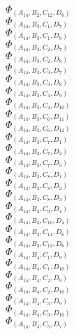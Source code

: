 \documentclass[14pt]{article}
\begin{document}
    $\Phi_{({A}_{14}, {B}_{2}, {C}_{12}, {D}_{6})}$ \\ 
    $\Phi_{({A}_{14}, {B}_{3}, {C}_{1}, {D}_{7})}$ \\ 
    $\Phi_{({A}_{14}, {B}_{3}, {C}_{1}, {D}_{8})}$ \\ 
    $\Phi_{({A}_{14}, {B}_{3}, {C}_{2}, {D}_{7})}$ \\ 
    $\Phi_{({A}_{14}, {B}_{3}, {C}_{2}, {D}_{8})}$ \\ 
    $\Phi_{({A}_{14}, {B}_{3}, {C}_{3}, {D}_{7})}$ \\ 
    $\Phi_{({A}_{14}, {B}_{3}, {C}_{3}, {D}_{8})}$ \\ 
    $\Phi_{({A}_{14}, {B}_{3}, {C}_{4}, {D}_{9})}$ \\ 
    $\Phi_{({A}_{14}, {B}_{3}, {C}_{4}, {D}_{10})}$ \\ 
    $\Phi_{({A}_{14}, {B}_{3}, {C}_{6}, {D}_{11})}$ \\ 
    $\Phi_{({A}_{14}, {B}_{3}, {C}_{6}, {D}_{12})}$ \\ 
    $\Phi_{({A}_{14}, {B}_{3}, {C}_{7}, {D}_{1})}$ \\ 
    $\Phi_{({A}_{14}, {B}_{3}, {C}_{7}, {D}_{2})}$ \\ 
    $\Phi_{({A}_{14}, {B}_{3}, {C}_{7}, {D}_{3})}$ \\ 
    $\Phi_{({A}_{14}, {B}_{3}, {C}_{8}, {D}_{1})}$ \\ 
    $\Phi_{({A}_{14}, {B}_{3}, {C}_{8}, {D}_{2})}$ \\ 
    $\Phi_{({A}_{14}, {B}_{3}, {C}_{8}, {D}_{3})}$ \\ 
    $\Phi_{({A}_{14}, {B}_{3}, {C}_{9}, {D}_{4})}$ \\ 
    $\Phi_{({A}_{14}, {B}_{3}, {C}_{10}, {D}_{4})}$ \\ 
    $\Phi_{({A}_{14}, {B}_{3}, {C}_{11}, {D}_{6})}$ \\ 
    $\Phi_{({A}_{14}, {B}_{3}, {C}_{12}, {D}_{6})}$ \\ 
    $\Phi_{({A}_{14}, {B}_{4}, {C}_{1}, {D}_{9})}$ \\ 
    $\Phi_{({A}_{14}, {B}_{4}, {C}_{1}, {D}_{10})}$ \\ 
    $\Phi_{({A}_{14}, {B}_{4}, {C}_{2}, {D}_{9})}$ \\ 
    $\Phi_{({A}_{14}, {B}_{4}, {C}_{2}, {D}_{10})}$ \\ 
    $\Phi_{({A}_{14}, {B}_{4}, {C}_{3}, {D}_{9})}$ \\ 
    $\Phi_{({A}_{14}, {B}_{4}, {C}_{3}, {D}_{10})}$ \\ 
    $\Phi_{({A}_{14}, {B}_{4}, {C}_{5}, {D}_{7})}$ \\ 
\end{document}
